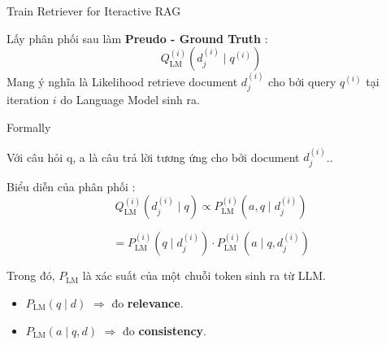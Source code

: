\documentclass{beamer}
\begin{document}













\begin{frame}{Train Retriever for Iteractive RAG} 

Lấy  phân phối sau làm \textbf{Preudo - Ground Truth} :
\[
Q^{(i)}_{\mathrm{LM}}\left(d^{(i)}_j \mid q^{(i)}\right)
\]
Mang ý nghĩa là Likelihood retrieve document \(d^{(i)}_j\) cho bởi query \(q^{(i)}\) tại iteration \(i\) do Language Model sinh ra.

\end{frame}

\begin{frame}{Formally}

Với câu hỏi q, a là câu trả lời tương ứng cho bởi document $d_j^{(i)}$..

Biểu diễn của phân phối :
\[
Q_{\mathrm{LM}}^{(i)}\left(d_j^{(i)} \mid q\right)
\propto
P_{\mathrm{LM}}^{(i)}\left(a, q \mid d_j^{(i)}\right)
\]

\[
=
P_{\mathrm{LM}}^{(i)}\left(q \mid d_j^{(i)}\right)
\cdot
P_{\mathrm{LM}}^{(i)}\left(a \mid q, d_j^{(i)}\right)
\]

Trong đó, \(P_{\mathrm{LM}}\) là xác suất của một chuỗi token sinh ra từ LLM.

\begin{itemize}
    \item \(P_{\mathrm{LM}}(q \mid d)\)
    \(\Rightarrow\) đo \textbf{relevance}.

    \item \(P_{\mathrm{LM}}(a \mid q,d)\)
    \(\Rightarrow\) đo \textbf{consistency}.
\end{itemize}

\end{frame}
\end{document}
